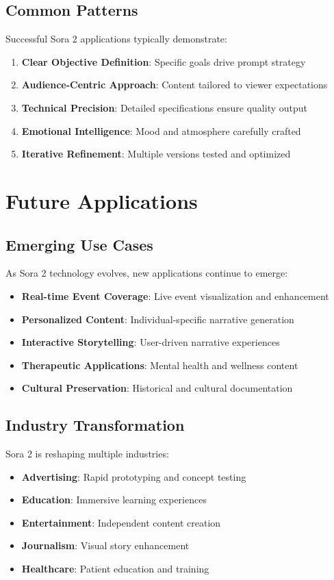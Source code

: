 \subsection{Common Patterns}
Successful Sora 2 applications typically demonstrate:

\begin{enumerate}
\item \textbf{Clear Objective Definition}: Specific goals drive prompt strategy
\item \textbf{Audience-Centric Approach}: Content tailored to viewer expectations
\item \textbf{Technical Precision}: Detailed specifications ensure quality output
\item \textbf{Emotional Intelligence}: Mood and atmosphere carefully crafted
\item \textbf{Iterative Refinement}: Multiple versions tested and optimized
\end{enumerate}

\section{Future Applications}

\subsection{Emerging Use Cases}
As Sora 2 technology evolves, new applications continue to emerge:

\begin{itemize}
\item \textbf{Real-time Event Coverage}: Live event visualization and enhancement
\item \textbf{Personalized Content}: Individual-specific narrative generation
\item \textbf{Interactive Storytelling}: User-driven narrative experiences
\item \textbf{Therapeutic Applications}: Mental health and wellness content
\item \textbf{Cultural Preservation}: Historical and cultural documentation
\end{itemize}

\subsection{Industry Transformation}
Sora 2 is reshaping multiple industries:

\begin{itemize}
\item \textbf{Advertising}: Rapid prototyping and concept testing
\item \textbf{Education}: Immersive learning experiences
\item \textbf{Entertainment}: Independent content creation
\item \textbf{Journalism}: Visual story enhancement
\item \textbf{Healthcare}: Patient education and training
\end{itemize}